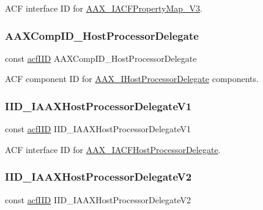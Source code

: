 A\+CF interface ID for \mbox{\hyperlink{a01753}{A\+A\+X\+\_\+\+I\+A\+C\+F\+Property\+Map\+\_\+\+V3}}. 

\mbox{\label{a00683_a40a355114433e32688af311798bbede0}} 
\subsubsection{\texorpdfstring{AAXCompID\_HostProcessorDelegate}{AAXCompID\_HostProcessorDelegate}}
{\footnotesize\ttfamily const \mbox{\hyperlink{a00269_a59df0b41744eee7a066787aaedf97f67}{acf\+I\+ID}} A\+A\+X\+Comp\+I\+D\+\_\+\+Host\+Processor\+Delegate}



A\+CF component ID for \mbox{\hyperlink{a01837}{A\+A\+X\+\_\+\+I\+Host\+Processor\+Delegate}} components. 

\mbox{\label{a00683_a835d34cca68638475f257a61cd4e8da3}} 
\subsubsection{\texorpdfstring{IID\_IAAXHostProcessorDelegateV1}{IID\_IAAXHostProcessorDelegateV1}}
{\footnotesize\ttfamily const \mbox{\hyperlink{a00269_a59df0b41744eee7a066787aaedf97f67}{acf\+I\+ID}} I\+I\+D\+\_\+\+I\+A\+A\+X\+Host\+Processor\+Delegate\+V1}



A\+CF interface ID for \mbox{\hyperlink{a01701}{A\+A\+X\+\_\+\+I\+A\+C\+F\+Host\+Processor\+Delegate}}. 

\mbox{\label{a00683_abd901e3dd8fe09daf43b8891084448f3}} 
\subsubsection{\texorpdfstring{IID\_IAAXHostProcessorDelegateV2}{IID\_IAAXHostProcessorDelegateV2}}
{\footnotesize\ttfamily const \mbox{\hyperlink{a00269_a59df0b41744eee7a066787aaedf97f67}{acf\+I\+ID}} I\+I\+D\+\_\+\+I\+A\+A\+X\+Host\+Processor\+Delegate\+V2}



